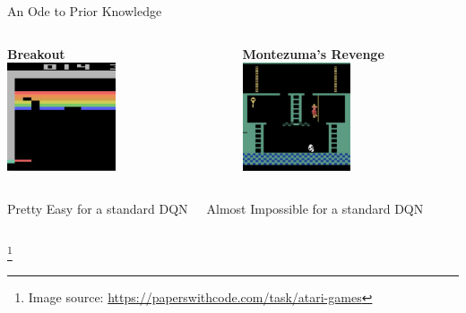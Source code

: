 \documentclass[aspectratio=169]{../latex_main/tntbeamer}  %
\begin{document}
\begin{frame}{An Ode to Prior Knowledge}

    \begin{columns}
        \begin{center}
        \textbf{Breakout}\\
        \includegraphics[width=0.5\textwidth]{images/t01/breakout.jpg}\\
        
        \end{center}
        
        \begin{center}
        \textbf{Montezuma's Revenge} \\
        \includegraphics[width=0.5\textwidth]{images/t01/montezuma.jpg}\\

    \end{center}
    
    \end{columns}
        
        
    \pause

    \begin{columns}
        \centering
        Pretty Easy for a standard DQN

        \centering
        Almost Impossible for a standard DQN
    \end{columns}
    
    \footnote{Image source: \url{https://paperswithcode.com/task/atari-games}}
    
\end{frame}
\end{document}

